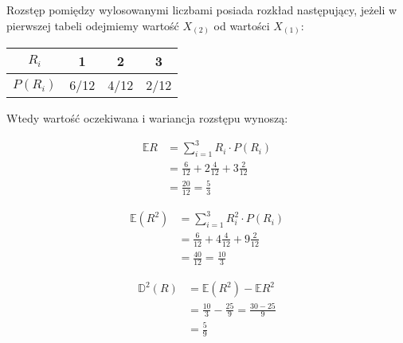 \documentclass{article}
\begin{document}
Rozstęp pomiędzy wylosowanymi liczbami posiada rozkład następujący, jeżeli w pierwszej tabeli odejmiemy wartość $X_{(2)} $ od wartości $X_{(1)}$:

\begin{center}
\begin{tabular}{|c|c|c|c|}
\hline
$R_i$ & 1 & 2 & 3 \\
\hline
$P(R_i)$ & 6/12 & 4/12 & 2/12 \\
\hline
\end{tabular}
\end{center}

Wtedy wartość oczekiwana i wariancja rozstępu wynoszą:

\begin{align*}
\mathbb{E}R & = \sum_{i=1}^{3} R_i \cdot P(R_i) \\
& = \frac{6}{12} + 2\frac{4}{12} + 3\frac{2}{12} \\
& = \frac{20}{12} = \frac{5}{3}
\end{align*}

\begin{align*}
\mathbb{E}(R^2) & = \sum_{i=1}^{3} R_i^2 \cdot P(R_i) \\
& = \frac{6}{12} + 4\frac{4}{12} + 9\frac{2}{12} \\
& = \frac{40}{12} = \frac{10}{3}
\end{align*}

\begin{align*}
\mathbb{D}^2(R) & = \mathbb{E}(R^2) - \mathbb{E}R^2 \\
& = \frac{10}{3} - \frac{25}{9} = \frac{30-25}{9} \\
& =  \frac{5}{9}
\end{align*}
\end{document}
